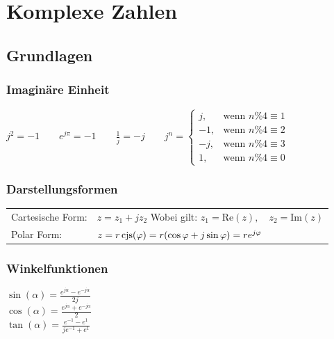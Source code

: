 \section{Komplexe Zahlen}
	\subsection{Grundlagen}
		\begin{minipage}[t]{11.5 cm}
				\subsubsection{Imaginäre Einheit}
				$j^2 = -1 \qquad e^{j\pi} = -1 \qquad \frac{1}{j} = -j \qquad   j^n =
																						\begin{cases} j,  & \text{wenn } n \% 4 \equiv 1 \\
																			            -1, & \text{wenn } n \% 4 \equiv 2 \\
																			            -j, & \text{wenn } n \% 4 \equiv 3 \\
																			            1,  & \text{wenn } n \% 4 \equiv 0 
																			          	\end{cases}$
	
			\subsubsection{Darstellungsformen}
				\begin{tabular}{ll}
					Cartesische Form: & $z = z_1 + j z_2$ \quad Wobei gilt: $z_1 = \text{Re}(z),
					\quad z_2 = \text{Im}(z)$ \\
					Polar Form: &   $z = r \operatorname{cjs}(\varphi) = r(\cos{\varphi} + j\sin{\varphi}) = r
					e^{j \varphi}$ 	\\
				\end{tabular}
		\end{minipage}
		\hspace*{0.5cm}						
		\begin{minipage}[t]{7 cm}
			\subsubsection{Winkelfunktionen}
				$\sin(\alpha)=\frac{e^{j\alpha}-e^{-j\alpha}}{2j}$ \\
				$\cos(\alpha)=\frac{e^{j\alpha}+e^{-j\alpha}}{2}$ \\
				$\tan(\alpha)=\frac{e^{-1}-e^{1}}{je^{-1}+e^1}$
		\end{minipage}
			
